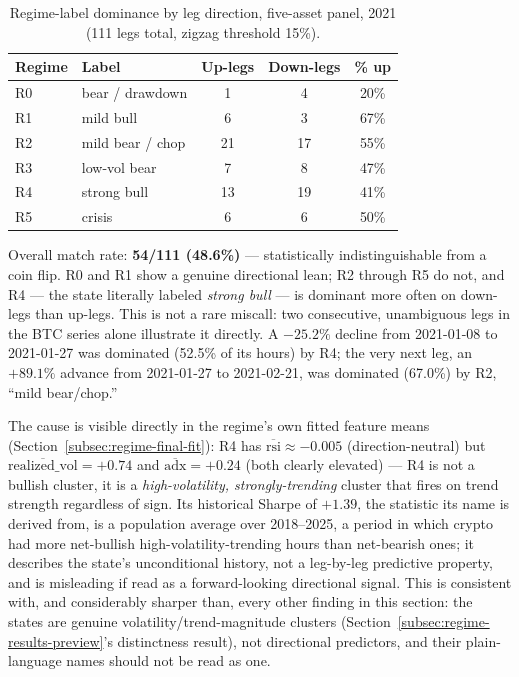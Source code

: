 \begin{table}[H]
\centering
\small
\caption{Regime-label dominance by leg direction, five-asset panel, 2021 (111 legs total, zigzag threshold 15\%).}
\label{tab:regime-zigzag}
\begin{tabular}{|l|l|c|c|c|}
\hline
\textbf{Regime} & \textbf{Label} & \textbf{Up-legs} & \textbf{Down-legs} & \textbf{\% up} \\
\hline
R0 & bear / drawdown & 1 & 4 & 20\% \\
\hline
R1 & mild bull & 6 & 3 & 67\% \\
\hline
R2 & mild bear / chop & 21 & 17 & 55\% \\
\hline
R3 & low-vol bear & 7 & 8 & 47\% \\
\hline
R4 & strong bull & 13 & 19 & 41\% \\
\hline
R5 & crisis & 6 & 6 & 50\% \\
\hline
\end{tabular}
\normalsize
\end{table}

Overall match rate: \textbf{54/111 (48.6\%)} --- statistically indistinguishable from a coin flip. R0 and R1 show a genuine directional lean; R2 through R5 do not, and R4 --- the state literally labeled \emph{strong bull} --- is dominant more often on down-legs than up-legs. This is not a rare miscall: two consecutive, unambiguous legs in the BTC series alone illustrate it directly. A $-25.2\%$ decline from 2021-01-08 to 2021-01-27 was dominated (52.5\% of its hours) by R4; the very next leg, an $+89.1\%$ advance from 2021-01-27 to 2021-02-21, was dominated (67.0\%) by R2, ``mild bear/chop.''

The cause is visible directly in the regime's own fitted feature means (Section~\ref{subsec:regime-final-fit}): R4 has $\overline{\mathrm{rsi}} \approx -0.005$ (direction-neutral) but $\overline{\mathrm{realized\_vol}} = +0.74$ and $\overline{\mathrm{adx}} = +0.24$ (both clearly elevated) --- R4 is not a bullish cluster, it is a \emph{high-volatility, strongly-trending} cluster that fires on trend strength regardless of sign. Its historical Sharpe of $+1.39$, the statistic its name is derived from, is a population average over 2018--2025, a period in which crypto had more net-bullish high-volatility-trending hours than net-bearish ones; it describes the state's unconditional history, not a leg-by-leg predictive property, and is misleading if read as a forward-looking directional signal. This is consistent with, and considerably sharper than, every other finding in this section: the states are genuine volatility/trend-magnitude clusters (Section~\ref{subsec:regime-results-preview}'s distinctness result), not directional predictors, and their plain-language names should not be read as one.

